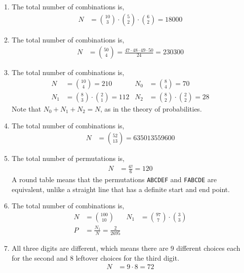 \begin{enumerate}
    \item The total number of combinations is,
          \begin{align}
              N & = \binom{10}{3} \cdot \binom{5}{2} \cdot \binom{6}{2} = 18000
          \end{align}

    \item The total number of combinations is,
          \begin{align}
              N & = \binom{50}{4} = \frac{47 \cdot 48 \cdot 49 \cdot 50}{24} = 230300
          \end{align}

    \item The total number of combinations is,
          \begin{align}
              N   & = \binom{10}{4} = 210                   &
              N_0 & = \binom{8}{4} = 70                       \\
              N_1 & = \binom{8}{3} \cdot \binom{2}{1} = 112 &
              N_2 & = \binom{8}{2} \cdot \binom{2}{2} = 28
          \end{align}
          Note that $ N_0 + N_1 + N_2 = N $, as in the theory of probabilities.

    \item The total number of combinations is,
          \begin{align}
              N & = \binom{52}{13} = \num{635013559600}
          \end{align}

    \item The total number of permutations is,
          \begin{align}
              N & = \frac{6!}{6} = 120
          \end{align}
          A round table means that the permutations \texttt{ABCDEF} and
          \texttt{FABCDE} are equivalent, unlike a straight line that has a definite
          start and end point.

    \item The total number of combinations is,
          \begin{align}
              N   & = \binom{100}{10}                  &
              N_1 & = \binom{97}{7} \cdot \binom{3}{3}   \\
              P   & = \frac{N_1}{N} = \frac{2}{2695}
          \end{align}

    \item All three digits are different, which means there are 9 different choices
          each for the second and 8 leftover choices for the third digit.
          \begin{align}
              N & = 9 \cdot 8 = 72
          \end{align}


\end{enumerate}
